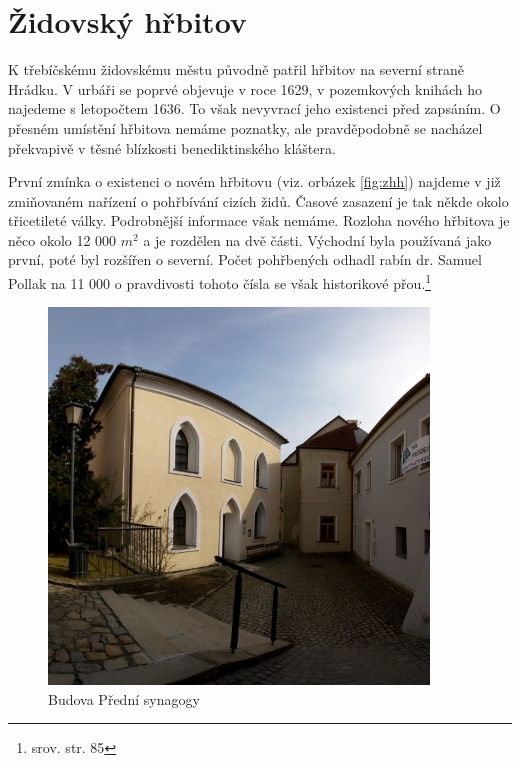 \documentclass[a4paper,oneside,12pt]{report}
\begin{document}
\section{Židovský hřbitov}

K třebíčskému židovskému městu původně patřil hřbitov na severní straně Hrádku.
V urbáři se poprvé objevuje v roce 1629, v pozemkových knihách ho najedeme s letopočtem 1636.
To však nevyvrací jeho existenci před zapsáním.
O přesném umístění hřbitova nemáme poznatky, ale pravděpodobně se nacházel překvapivě v těsné blízkosti benediktinského kláštera.

První zmínka o existenci o novém hřbitovu (viz. orbázek \ref{fig:zhh}) najdeme v již zmiňovaném nařízení o pohřbívání cizích židů.
Časové zasazení je tak někde okolo třicetileté války.
Podrobnější informace však nemáme.
Rozloha nového hřbitova je něco okolo 12 000 $m^2$ a je rozdělen na dvě části.
Východní byla používaná jako první, poté byl rozšířen o severní.
Počet pohřbených odhadl rabín dr. Samuel Pollak na 11 000 o pravdivosti tohoto čísla se však historikové přou.\footnote{srov. \cite{Fiser2005} str. 85}


\begin{figure}[h]
	\centering
	\includegraphics[height=10cm]{../img/predniSynagogaBudova}
	\caption[Přední synagoga \text{[online]} MKS Třebíč. Dostupné z: \url{https://www.mkstrebic.cz/data_5/fotogalerie/15normal.jpg} \text{[cit. 2020-03-26]}]{
		Budova Přední synagogy
	}
	\label{fig:psb}
\end{figure}
\end{document}
